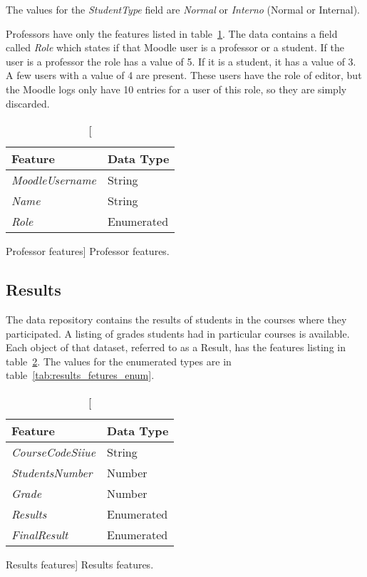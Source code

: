 The values for the \textit{StudentType} field are \textit{Normal} or
\textit{Interno} (Normal or Internal).

Professors have only the features listed in table~\ref{tab:professor_features}.
The data contains a field called \textit{Role} which states if that Moodle user
is a professor or a student. If the user is a professor the role has a value of
5. If it is a student, it has a value of 3. A few users with a value of 4 are
present. These users have the role of editor, but the Moodle logs only have 10
entries for a user of this role, so they are simply discarded.

\begin{table}[h!]
    \centering

    \begin{tabular}{l l}
        Feature                 & Data Type \\ \hline
        \textit{MoodleUsername} & String    \\
        \textit{Name}           & String    \\
        \textit{Role}           & Enumerated \\
    \end{tabular}

    \caption
        [Professor features]
        {Professor features.}

    \label{tab:professor_features}
\end{table}

\subsection{Results}
\label{sec:results}

The data repository contains the results of students in the courses where they
participated. A listing of grades students had in particular courses is
available. Each object of that dataset, referred to as a Result, has the
features listing in table~\ref{tab:results_fetures}. The values for the
enumerated types are in table~\ref{tab:results_fetures_enum}.

\begin{table}[h!]
    \centering

    \begin{tabular}{l l}
        Feature                  & Data Type  \\ \hline
        \textit{CourseCodeSiiue} & String     \\
        \textit{StudentsNumber}  & Number     \\
        \textit{Grade}           & Number     \\
        \textit{Results}         & Enumerated \\
        \textit{FinalResult}     & Enumerated \\
    \end{tabular}

    \caption
        [Results features]
        {Results features.}

    \label{tab:results_fetures}
\end{table}

